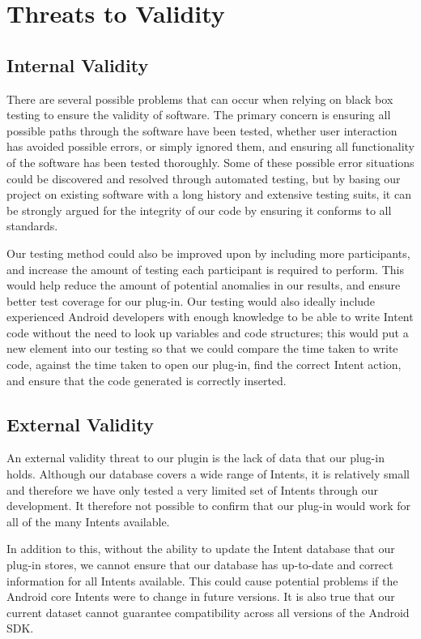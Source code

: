 \section{Threats to Validity}
\label{threatstovalidity}

\subsection{Internal Validity}
There are several possible problems that can occur when relying on black box testing to ensure the validity of software. The primary concern is ensuring all possible paths through the software have been tested, whether user interaction has avoided possible errors, or simply ignored them, and ensuring all functionality of the software has been tested thoroughly. Some of these possible error situations could be discovered and resolved through automated testing, but by basing our project on existing software with a long history and extensive testing suits, it can be strongly argued for the integrity of our code by ensuring it conforms to all standards.

Our testing method could also be improved upon by including more participants, and increase the amount of testing each participant is required to perform. This would help reduce the amount of potential anomalies in our results, and ensure better test coverage for our plug-in. Our testing would also ideally include experienced Android developers with enough knowledge to be able to write Intent code without the need to look up variables and code structures; this would put a new element into our testing so that we could compare the time taken to write code, against the time taken to open our plug-in, find the correct Intent action, and ensure that the code generated is correctly inserted.


\subsection{External Validity}

An external validity threat to our plugin is the lack of data that our plug-in holds. Although our database covers a wide range of Intents, it is relatively small and therefore we have only tested a very limited set of Intents through our development. It therefore not possible to confirm that our plug-in would work for all of the many Intents available.

In addition to this, without the ability to update the Intent database that our plug-in stores, we cannot ensure that our database has up-to-date and correct information for all Intents available. This could cause potential problems if the Android core Intents were to change in future versions. It is also true that our current dataset cannot guarantee compatibility across all versions of the Android SDK.